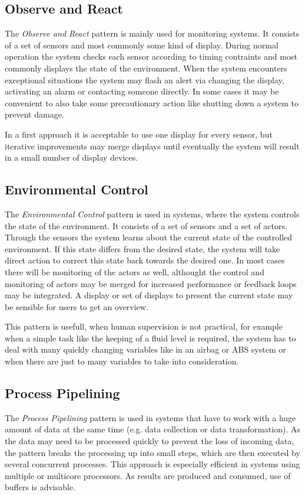 \documentclass[10pt,a4paper,titlepage,draft]{scrartcl} %
\begin{document}
\subsection{Observe and React}
The \emph{Observe and React} pattern is mainly used for monitoring systems.
It consists of a set of sensors and most commonly some kind of display.
During normal operation the system checks each sensor according to timing contraints and most commonly displays the state of the environment.
When the system encounters exceptional situations the system may flash an alert via changing the display, activating an alarm or contacting someone directly.
In some cases it may be convenient to also take some precautionary action like shutting down a system to prevent damage.

In a first approach it is acceptable to use one display for every sensor, but iterative improvements may merge displays until eventually the system will result in a small number of display devices.

\subsection{Environmental Control}
The \emph{Environmental Control} pattern is used in systems, where the system controls the state of the environment.
It consists of a set of sensors and a set of actors.
Through the sensors the system learns about the current state of the controlled environment.
If this state differs from the desired state, the system will take direct action to correct this state back towards the desired one.
In most cases there will be monitoring of the actors as well, althought the control and monitoring of actors may be merged for increased performance or feedback loops may be integrated.
A display or set of displays to present the current state may be sensible for users to get an overview.

This pattern is usefull, when human supervision is not practical, for example when a simple task like the keeping of a fluid level is required, the system has to deal with many quickly changing variables like in an airbag or ABS system or when there are just to many variables to take into consideration.

\subsection{Process Pipelining}
The \emph{Process Pipelining} pattern is used in systems that have to work with a huge amount of data at the same time (e.g. data collection or data transformation).
As the data may need to be processed quickly to prevent the loss of incoming data, the pattern breaks the processing up into small steps, which are then executed by several concurrent processes.
This approach is especially efficient in systems using multiple or multicore processors.
As results are produced and consumed, use of buffers is advisable.
\end{document}
